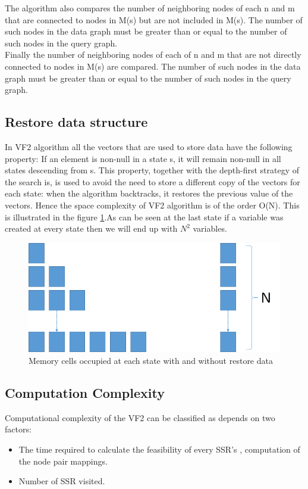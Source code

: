 The algorithm also compares the number of neighboring nodes of each n and m that are connected to nodes in M(s) but are not
included in M(s). The number of such nodes in the data graph must be greater than or equal to the number of such nodes in the query graph.\\

Finally the number of neighboring nodes of each of n and m that are not directly connected to nodes in M(s) are compared. The number of 
such nodes in the data graph must be greater than or equal to the number of such nodes in the query graph.

\subsection{Restore data structure}
In VF2 algorithm all the vectors that are used to store data have the following property: If an element is non-null in a state s, it will remain non-null in all states descending from s. This property, together with the depth-first strategy of the search is, is used to avoid the need to store a different copy of the vectors for each state: when the algorithm backtracks, it restores the previous value of the vectors. Hence the space complexity of VF2 algorithm is of the order O(N). This is illustrated in the figure \ref{fig:memManagement}.As can be seen at the last state if a variable was created at every state then we will end up with $N^2$ variables.

\begin{figure}
\includegraphics[scale=0.5]{./pics/memManagement.png}
\caption{Memory cells occupied at each state with and without restore data}
\label{fig:memManagement}
\centering
\end{figure}

\subsection{Computation Complexity}
Computational complexity of the VF2 can be classified as depends on two factors: 
\begin{itemize}
\item The time required to calculate the feasibility of every SSR's , computation of the node pair mappings.
\item Number of SSR visited.
\end{itemize}

